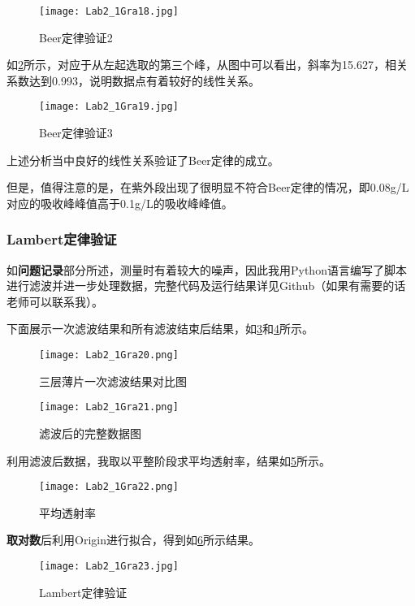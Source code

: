 \documentclass[dvipsnames, svgnames,a4paper,11pt]{article}
\begin{document}
	\begin{figure}[htbp]
		\centering
		\texttt{[image: Lab2\_1Gra18.jpg]}
		\caption{Beer定律验证2}
		\label{fig:fig18}
	\end{figure}
	
	\clearpage
	如\cref{fig:fig19}所示，对应于从左起选取的第三个峰，从图中可以看出，斜率为15.627，相关系数达到0.993，说明数据点有着较好的线性关系。
	
	\begin{figure}[htbp]
		\centering
		\texttt{[image: Lab2\_1Gra19.jpg]}
		\caption{Beer定律验证3}
		\label{fig:fig19}
	\end{figure}
	
	上述分析当中良好的线性关系验证了Beer定律的成立。
	
	但是，值得注意的是，在紫外段出现了很明显不符合Beer定律的情况，即0.08g/L对应的吸收峰峰值高于0.1g/L的吸收峰峰值。
	
	\subsubsection{Lambert定律验证}
	如\textbf{问题记录}部分所述，测量时有着较大的噪声，因此我用Python语言编写了脚本进行滤波并进一步处理数据，完整代码及运行结果详见Github（如果有需要的话老师可以联系我）。
	
	下面展示一次滤波结果和所有滤波结束后结果，如\cref{fig:fig20}和\cref{fig:fig21}所示。
	
	\begin{figure}[htbp]
		\centering
		\texttt{[image: Lab2\_1Gra20.png]}
		\caption{三层薄片一次滤波结果对比图}
		\label{fig:fig20}
	\end{figure}
	
	\begin{figure}[htbp]
		\centering
		\texttt{[image: Lab2\_1Gra21.png]}
		\caption{滤波后的完整数据图}
		\label{fig:fig21}
	\end{figure}
	
	利用滤波后数据，我取以平整阶段求平均透射率，结果如\cref{fig:fig22}所示。
	
	\begin{figure}[htbp]
		\centering
		\texttt{[image: Lab2\_1Gra22.png]}
		\caption{平均透射率}
		\label{fig:fig22}
	\end{figure}
	
	\textbf{取对数}后利用Origin进行拟合，得到如\cref{fig:fig23}所示结果。
	
	\begin{figure}[htbp]
		\centering
		\texttt{[image: Lab2\_1Gra23.jpg]}
		\caption{Lambert定律验证}
		\label{fig:fig23}
	\end{figure}
	
\end{document}
